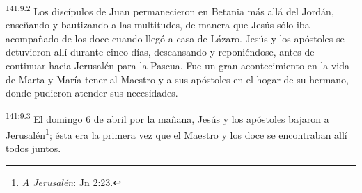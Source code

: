 \par 
\textsuperscript{141:9.2} Los discípulos de Juan permanecieron en Betania más allá del Jordán, enseñando y bautizando a las multitudes, de manera que Jesús sólo iba acompañado de los doce cuando llegó a casa de Lázaro. Jesús y los apóstoles se detuvieron allí durante cinco días, descansando y reponiéndose, antes de continuar hacia Jerusalén para la Pascua. Fue un gran acontecimiento en la vida de Marta y María tener al Maestro y a sus apóstoles en el hogar de su hermano, donde pudieron atender sus necesidades.

\par 
\textsuperscript{141:9.3} El domingo 6 de abril por la mañana, Jesús y los apóstoles bajaron a Jerusalén\footnote{\textit{A Jerusalén}: Jn 2:23.}; ésta era la primera vez que el Maestro y los doce se encontraban allí todos juntos.